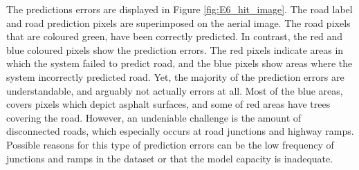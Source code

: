 The predictions errors are displayed in Figure \ref{fig:E6_hit_image}. The road label and road prediction pixels are superimposed on the aerial image. The road pixels that are coloured green, have been correctly predicted. In contrast, the red and blue coloured pixels show the prediction errors. The red pixels indicate areas in which the system failed to predict road, and the blue pixels show areas where the system incorrectly predicted road. Yet, the majority of the prediction errors are understandable, and arguably not actually errors at all. Most of the blue areas, covers pixels which depict asphalt surfaces, and some of red areas have trees covering the road. However, an undeniable challenge is the amount of disconnected roads, which especially occurs at road junctions and highway ramps. Possible reasons for this type of prediction errors can be the low frequency of junctions and ramps in the dataset or that the model capacity is inadequate. \\
